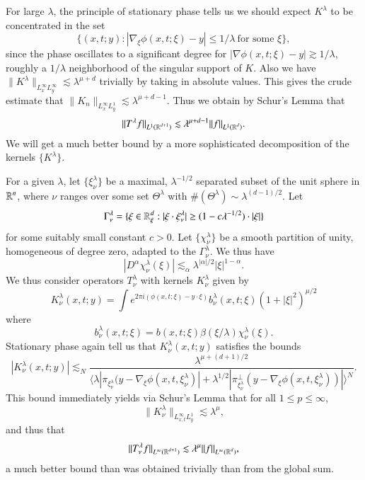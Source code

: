 For large $\lambda$, the principle of stationary phase tells us we should expect $K^\lambda$ to be concentrated in the set
%
\[ \{ (x,t;y) : |\nabla_\xi \phi(x,t;\xi) - y| \leq 1/\lambda\ \text{for some $\xi$} \}, \]
%
since the phase oscillates to a significant degree for $|\nabla \phi(x,t;\xi) - y| \gtrsim 1/\lambda$, roughly a $1/\lambda$ neighborhood of the singular support of $K$. Also we have $\| K^\lambda \|_{L^\infty_x L^\infty_y} \lesssim \lambda^{\mu + d}$ trivially by taking in absolute values. This gives the crude estimate that $\| K_n \|_{L^\infty_x L^1_y} \lesssim \lambda^{\mu + d - 1}$. Thus we obtain by Schur's Lemma that
%
\[ \| T^\lambda f \|_{L^1(\operatorname{\mathbb{R}}^{d+1})} \lesssim \lambda^{\mu + d - 1} \| f \|_{L^1(\operatorname{\mathbb{R}}^d)}. \]
%
We will get a much better bound by a more sophisticated decomposition of the kernels $\{ K^\lambda \}$.

For a given $\lambda$, let $\{ \xi_\nu^\lambda \}$ be a maximal, $\lambda^{-1/2}$ separated subset of the unit sphere in $\operatorname{\mathbb{R}}^n$, where $\nu$ ranges over some set $\Theta^\lambda$ with $\#(\Theta^\lambda) \sim \lambda^{(d-1)/2}$. Let
%
\[ \Gamma^\lambda_\nu = \{ \xi \in \operatorname{\mathbb{R}}^d_\xi : |\xi \cdot \xi^\lambda_\nu| \geq (1 - c \lambda^{-1/2}) \cdot |\xi| \} \]
%
for some suitably small constant $c > 0$. Let $\{ \chi^\lambda_\nu \}$ be a smooth partition of unity, homogeneous of degree zero, adapted to the $\Gamma^\lambda_\nu$. We thus have
%
\[ |D^\alpha \chi^\lambda_\nu(\xi)| \lesssim_\alpha \lambda^{|\alpha|/2} |\xi|^{1 - \alpha}. \]
%
We thus consider operators $T^\lambda_\nu$ with kernels $K^\lambda_\nu$ given by
%
\[ K^\lambda_\nu(x,t;y) = \int e^{2 \pi i (\phi(x,t;\xi) - y \cdot \xi)} b^\lambda_\nu(x,t;\xi) ( 1 + |\xi|^2 )^{\mu/2} \]
%
where
%
\[ b^\lambda_\nu(x,t;\xi) = b(x,t;\xi) \beta(\xi / \lambda) \chi^\lambda_\nu(\xi). \]
%
Stationary phase again tell us that $K^\lambda_\nu(x,t;y)$ satisfies the bounds
%
\[ |K^\lambda_\nu(x,t;y)| \lesssim_N \frac{\lambda^{\mu + (d+1)/2}}{\langle \lambda | \pi_{\xi^\lambda_\nu} (y - \nabla_\xi \phi(x,t,\xi^\lambda_\nu)| + \lambda^{1/2} | \pi_{\xi^\lambda_\nu}^\perp (y - \nabla_\xi \phi(x,t,\xi^\lambda_\nu)) | \rangle^N}. \]
%
This bound immediately yields via Schur's Lemma that for all $1 \leq p \leq \infty$,
%
\[ \| K^\lambda_\nu \|_{L^\infty_{x,t} L^1_y} \lesssim \lambda^\mu, \]
%
and thus that
%
\[ \| T^\lambda_\nu f \|_{L^\infty(\operatorname{\mathbb{R}}^{d+1})} \lesssim \lambda^\mu \| f \|_{L^\infty(\operatorname{\mathbb{R}}^d)}, \]
%
a much better bound than was obtained trivially than from the global sum.

